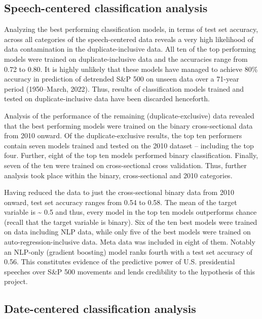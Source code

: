 \documentclass[11pt,preprint, authoryear]{elsarticle}
\numberwithin{equation}{section}
\numberwithin{figure}{section}
\numberwithin{table}{section}
\begin{document}
\hypertarget{speech-centered-classification-analysis}{%
\subsection{\texorpdfstring{Speech-centered classification analysis
\label{speech-centered}}{Speech-centered classification analysis }}\label{speech-centered-classification-analysis}}

Analyzing the best performing classification models, in terms of test
set accuracy, across all categories of the speech-centered data reveals
a very high likelihood of data contamination in the duplicate-inclusive
data. All ten of the top performing models were trained on
duplicate-inclusive data and the accuracies range from 0.72 to 0.80. It
is highly unlikely that these models have managed to achieve 80\%
accuracy in prediction of detrended S\&P 500 on unseen data over a
71-year period (1950--March, 2022). Thus, results of classification
models trained and tested on duplicate-inclusive data have been
discarded henceforth.

Analysis of the performance of the remaining (duplicate-exclusive) data
revealed that the best performing models were trained on the binary
cross-sectional data from 2010 onward. Of the duplicate-exclusive
results, the top ten performers contain seven models trained and tested
on the 2010 dataset -- including the top four. Further, eight of the top
ten models performed binary classification. Finally, seven of the ten
were trained on cross-sectional cross validation. Thus, further analysis
took place within the binary, cross-sectional and 2010 categories.

Having reduced the data to just the cross-sectional binary data from
2010 onward, test set accuracy ranges from 0.54 to 0.58. The mean of the
target variable is \textasciitilde{} 0.5 and thus, every model in the
top ten models outperforms chance (recall that the target variable is
binary). Six of the ten best models were trained on data including NLP
data, while only five of the best models were trained on
auto-regression-inclusive data. Meta data was included in eight of them.
Notably an NLP-only (gradient boosting) model ranks fourth with a test
set accuracy of 0.56. This constitutes evidence of the predictive power
of U.S. presidential speeches over S\&P 500 movements and lends
credibility to the hypothesis of this project.

\hypertarget{date-centered-classification-analysis}{%
\subsection{\texorpdfstring{Date-centered classification analysis
\label{Date-centered classification}}{Date-centered classification analysis }}\label{date-centered-classification-analysis}}
\end{document}
